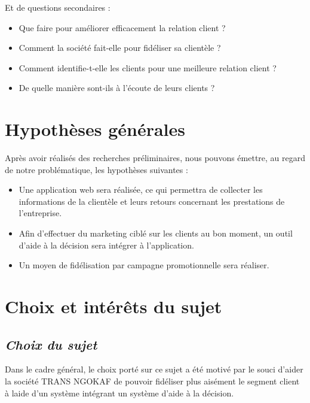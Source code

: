     Et de questions secondaires :
    \par
        \begin{itemize}
            \setlength{\itemsep}{0pt}
            \item [\ding{226}] Que faire pour améliorer efficacement la relation client ?
            \item [\ding{226}] Comment la société fait-elle pour fidéliser sa clientèle ?
            \item [\ding{226}] Comment identifie-t-elle les clients pour une
            meilleure relation client ?
            \item [\ding{226}] De quelle manière sont-ils à l’écoute de leurs clients ?
        \end{itemize}
    \section[Hypothèses générales]{Hypothèses générales}
    Après avoir réalisés des recherches préliminaires, nous pouvons émettre, au regard
    de notre problématique, les hypothèses suivantes :
    \par
        \begin{itemize}
            \setlength{\itemsep}{0pt}
            \item [\ding{226}] Une application web sera réalisée, ce qui permettra de collecter
            les informations de la clientèle et leurs retours concernant les prestations de l’entreprise.
            \item [\ding{226}] Afin d’effectuer du marketing ciblé sur les clients au bon moment,
            un outil d’aide à la décision sera intégrer à l’application.
            \item [\ding{226}] Un moyen de fidélisation par campagne promotionnelle sera réaliser.
        \end{itemize}
    \section[Choix et interet du sujet]{Choix et intérêts du sujet}
        \subsection[Choix du sujet]{\textit{Choix du sujet}}
        Dans le cadre général, le choix porté sur ce sujet a été motivé par le souci d’aider
        la société TRANS NGOKAF de pouvoir fidéliser plus aisément le segment client à laide d’un
        système intégrant un système d’aide à la décision.
